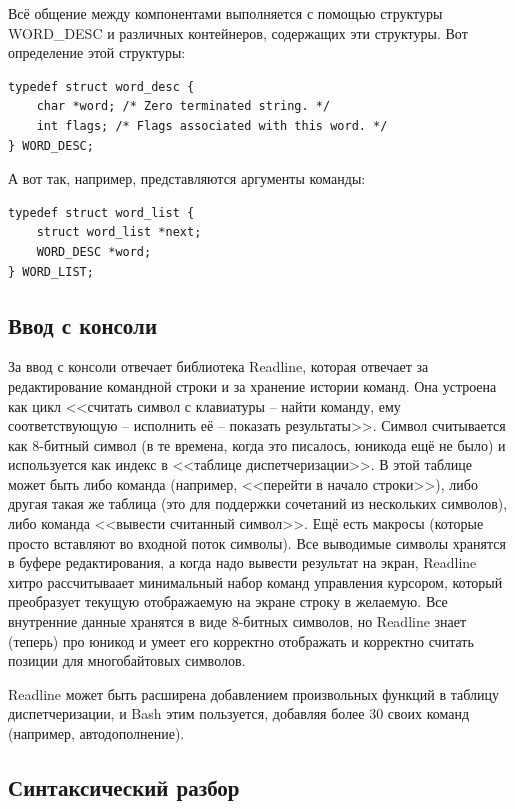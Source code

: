\documentclass{../../text-style}
\begin{document}
Всё общение между компонентами выполняется с помощью структуры WORD\_DESC и различных контейнеров, содержащих эти структуры. Вот определение этой структуры:

\begin{verbatim}
typedef struct word_desc {
    char *word; /* Zero terminated string. */
    int flags; /* Flags associated with this word. */
} WORD_DESC;
\end{verbatim}

А вот так, например, представляются аргументы команды:

\begin{verbatim}
typedef struct word_list {
    struct word_list *next;
    WORD_DESC *word;
} WORD_LIST;
\end{verbatim}

\subsection{Ввод с консоли}

За ввод с консоли отвечает библиотека Readline, которая отвечает за редактирование командной строки и за хранение истории команд. Она устроена как цикл <<считать символ с клавиатуры -- найти команду, ему соответствующую -- исполнить её -- показать результаты>>. Символ считывается как 8-битный символ (в те времена, когда это писалось, юникода ещё не было) и используется как индекс в <<таблице диспетчеризации>>. В этой таблице может быть либо команда (например, <<перейти в начало строки>>), либо другая такая же таблица (это для поддержки сочетаний из нескольких символов), либо команда <<вывести считанный символ>>. Ещё есть макросы (которые просто вставляют во входной поток символы). Все выводимые символы хранятся в буфере редактирования, а когда надо вывести результат на экран, Readline хитро рассчитываает минимальный набор команд управления курсором, который преобразует текущую отображаемую на экране строку в желаемую. Все внутренние данные хранятся в виде 8-битных символов, но Readline знает (теперь) про юникод и умеет его корректно отображать и корректно считать позиции для многобайтовых символов.

Readline может быть расширена добавлением произвольных функций в таблицу диспетчеризации, и Bash этим пользуется, добавляя более 30 своих команд (например, автодополнение).

\subsection{Синтаксический разбор}
\end{document}

